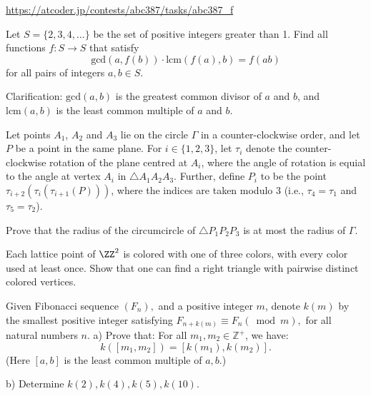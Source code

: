 \documentclass[11pt]{scrartcl}
\begin{document}
\begin{problem}[AC ABC387F]
\url{https://atcoder.jp/contests/abc387/tasks/abc387_f}
\end{problem}
\begin{problem}[Rioplatense 2024/3.5]
    Let $S = \{2, 3, 4, \dots\}$ be the set of positive integers greater than 1. Find all functions $f : S \to S$ that satisfy
\[
\text{gcd}(a, f(b)) \cdot \text{lcm}(f(a), b) = f(ab)
\]for all pairs of integers $a, b \in S$.

Clarification: $\text{gcd}(a,b)$ is the greatest common divisor of $a$ and $b$, and $\text{lcm}(a,b)$ is the least common multiple of $a$ and $b$.
\end{problem}
\begin{problem}[India 2024/5]
Let points $A_1$, $A_2$ and $A_3$ lie on the circle $\Gamma$ in a counter-clockwise order, and let $P$ be a point in the same plane. For $i \in \{1,2,3\}$, let $\tau_i$ denote the counter-clockwise rotation of the plane centred at $A_i$, where the angle of rotation is equial to the angle at vertex $A_i$ in $\triangle A_1A_2A_3$. Further, define $P_i$ to be the point $\tau_{i+2}(\tau_{i}(\tau_{i+1}(P)))$, where the indices are taken modulo $3$ (i.e., $\tau_4 = \tau_1$ and $\tau_5 = \tau_2$).

Prove that the radius of the circumcircle of $\triangle P_1P_2P_3$ is at most the radius of $\Gamma$.
\end{problem}
\begin{problem}
  Each lattice point of $\ZZ^2$ is colored with one of three colors,
  with every color used at least once.
  Show that one can find a right triangle with pairwise distinct colored vertices.
\end{problem}
\begin{problem}
Given Fibonacci sequence $(F_n),$ and a positive integer $m$, denote $k(m)$ by the smallest positive integer satisfying $F_{n+k(m)}\equiv F_n(\bmod m),$ for all natural numbers $n$.
a) Prove that: For all $m_1,m_2\in \mathbb{Z^+}$, we have:$$k([m_1,m_2])=[k(m_1),k(m_2)].$$(Here $[a,b]$ is the least common multiple of $a,b.$)

b) Determine $k(2),k(4),k(5),k(10).$
\end{problem}
\end{document}
